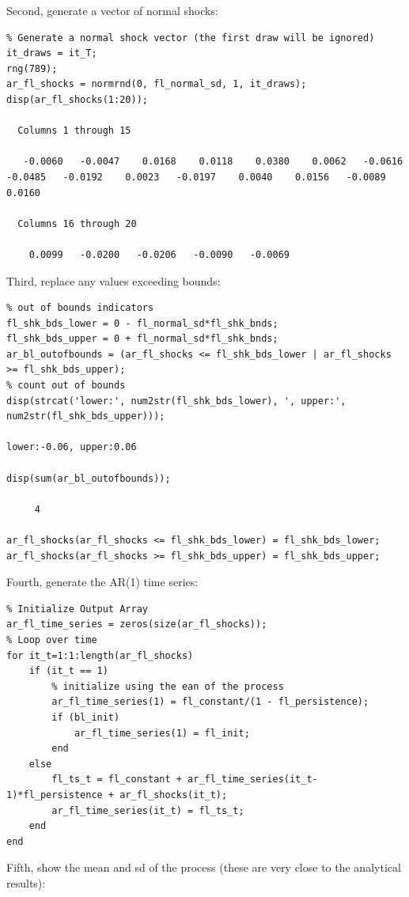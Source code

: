 \documentclass[
]{book}
\begin{document}
Second, generate a vector of normal shocks:

\begin{verbatim}
% Generate a normal shock vector (the first draw will be ignored)
it_draws = it_T;
rng(789);
ar_fl_shocks = normrnd(0, fl_normal_sd, 1, it_draws);
disp(ar_fl_shocks(1:20));

  Columns 1 through 15

   -0.0060   -0.0047    0.0168    0.0118    0.0380    0.0062   -0.0616   -0.0485   -0.0192    0.0023   -0.0197    0.0040    0.0156   -0.0089    0.0160

  Columns 16 through 20

    0.0099   -0.0200   -0.0206   -0.0090   -0.0069
\end{verbatim}

Third, replace any values exceeding bounds:

\begin{verbatim}
% out of bounds indicators
fl_shk_bds_lower = 0 - fl_normal_sd*fl_shk_bnds;
fl_shk_bds_upper = 0 + fl_normal_sd*fl_shk_bnds;
ar_bl_outofbounds = (ar_fl_shocks <= fl_shk_bds_lower | ar_fl_shocks >= fl_shk_bds_upper);
% count out of bounds
disp(strcat('lower:', num2str(fl_shk_bds_lower), ', upper:', num2str(fl_shk_bds_upper)));

lower:-0.06, upper:0.06

disp(sum(ar_bl_outofbounds));

     4

ar_fl_shocks(ar_fl_shocks <= fl_shk_bds_lower) = fl_shk_bds_lower;
ar_fl_shocks(ar_fl_shocks >= fl_shk_bds_upper) = fl_shk_bds_upper;
\end{verbatim}

Fourth, generate the AR(1) time series:

\begin{verbatim}
% Initialize Output Array
ar_fl_time_series = zeros(size(ar_fl_shocks));
% Loop over time
for it_t=1:1:length(ar_fl_shocks)
    if (it_t == 1)
        % initialize using the ean of the process
        ar_fl_time_series(1) = fl_constant/(1 - fl_persistence);
        if (bl_init)
            ar_fl_time_series(1) = fl_init;            
        end
    else
        fl_ts_t = fl_constant + ar_fl_time_series(it_t-1)*fl_persistence + ar_fl_shocks(it_t);
        ar_fl_time_series(it_t) = fl_ts_t;
    end
end
\end{verbatim}

Fifth, show the mean and sd of the process (these are very close to the
analytical results):
\end{document}
